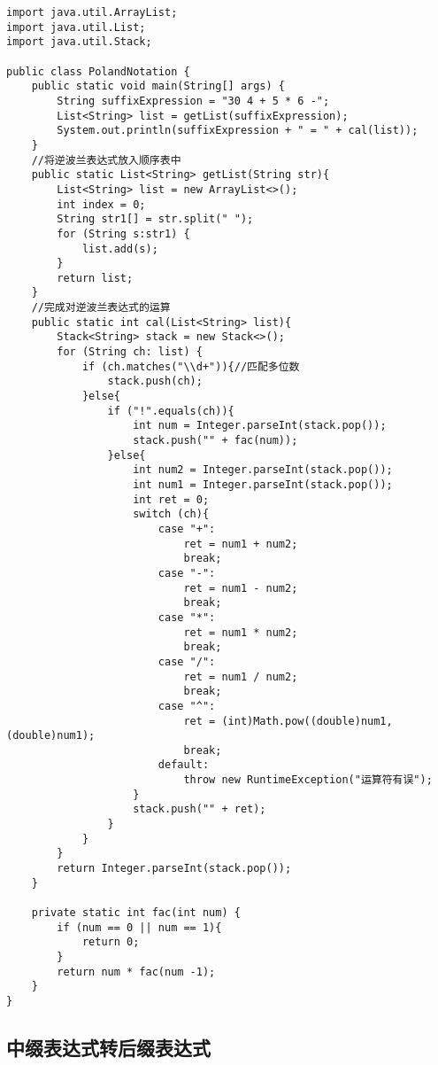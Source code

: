 \documentclass[a4paper]{report}
\begin{document}
\begin{lstlisting}
import java.util.ArrayList;
import java.util.List;
import java.util.Stack;

public class PolandNotation {
    public static void main(String[] args) {
        String suffixExpression = "30 4 + 5 * 6 -";
        List<String> list = getList(suffixExpression);
        System.out.println(suffixExpression + " = " + cal(list));
    }
    //将逆波兰表达式放入顺序表中
    public static List<String> getList(String str){
        List<String> list = new ArrayList<>();
        int index = 0;
        String str1[] = str.split(" ");
        for (String s:str1) {
            list.add(s);
        }
        return list;
    }
    //完成对逆波兰表达式的运算
    public static int cal(List<String> list){
        Stack<String> stack = new Stack<>();
        for (String ch: list) {
            if (ch.matches("\\d+")){//匹配多位数
                stack.push(ch);
            }else{
                if ("!".equals(ch)){
                    int num = Integer.parseInt(stack.pop());
                    stack.push("" + fac(num));
                }else{
                    int num2 = Integer.parseInt(stack.pop());
                    int num1 = Integer.parseInt(stack.pop());
                    int ret = 0;
                    switch (ch){
                        case "+":
                            ret = num1 + num2;
                            break;
                        case "-":
                            ret = num1 - num2;
                            break;
                        case "*":
                            ret = num1 * num2;
                            break;
                        case "/":
                            ret = num1 / num2;
                            break;
                        case "^":
                            ret = (int)Math.pow((double)num1,(double)num1);
                            break;
                        default:
                            throw new RuntimeException("运算符有误");
                    }
                    stack.push("" + ret);
                }
            }
        }
        return Integer.parseInt(stack.pop());
    }

    private static int fac(int num) {
        if (num == 0 || num == 1){
            return 0;
        }
        return num * fac(num -1);
    }
}
\end{lstlisting}
\subsection{中缀表达式转后缀表达式}
\end{document}
